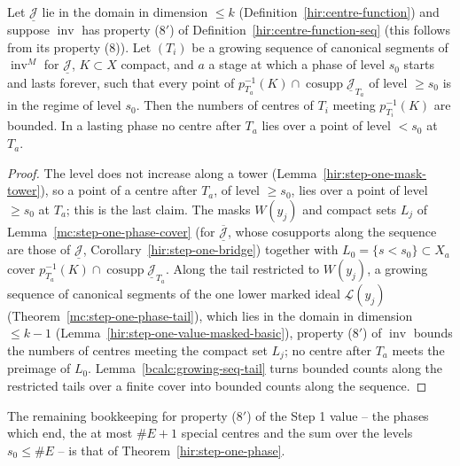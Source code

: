 \begin{theorem}
\label{mc:step-one-phase-bound}
\leanok
Let \(\underline{\mathcal J}\) lie in the domain in dimension \(\le k\) (Definition~\ref{hir:centre-function}) and suppose \(\operatorname{inv}\) has property (8\('\)) of
Definition~\ref{hir:centre-function-seq} (this follows from its property (8)). Let \((T_i)\) be a growing sequence of canonical segments of \(\operatorname{inv}^M\) for
\(\underline{\mathcal J}\), \(K\subset X\) compact, and \(a\) a stage at which a phase of level \(s_0\) starts and lasts forever, such that every point of
\(p_{T_a}^{-1}(K)\cap\operatorname{cosupp}\underline{\mathcal J}_{T_a}\) of level \(\ge s_0\) is in the regime of level \(s_0\). Then the numbers of centres of \(T_i\) meeting
\(p_{T_i}^{-1}(K)\) are bounded. In a lasting phase no centre after \(T_a\) lies over a point of level \(<s_0\) at \(T_a\).
\end{theorem}
\begin{proof}
\leanok
The level does not increase along a tower (Lemma~\ref{hir:step-one-mask-tower}), so a point of a centre after \(T_a\), of level \(\ge s_0\), lies over a point of level \(\ge s_0\)
at \(T_a\); this is the last claim. The masks \(W(y_j)\) and compact sets \(L_j\) of Lemma~\ref{mc:step-one-phase-cover} (for \(\overline{\underline{\mathcal J}}\), whose cosupports along the
sequence are those of \(\underline{\mathcal J}\), Corollary~\ref{hir:step-one-bridge}) together with \(L_0=\{s<s_0\}\subset X_a\) cover
\(p_{T_a}^{-1}(K)\cap\operatorname{cosupp}\underline{\mathcal J}_{T_a}\). Along the tail restricted to \(W(y_j)\), a growing sequence of canonical segments of the one lower marked ideal
\(\underline{\mathcal L}(y_j)\) (Theorem~\ref{mc:step-one-phase-tail}), which lies in the domain in dimension \(\le k-1\) (Lemma~\ref{hir:step-one-value-masked-basic}), property
(8\('\)) of \(\operatorname{inv}\) bounds the numbers of centres meeting the compact set \(L_j\); no centre after \(T_a\) meets the preimage of \(L_0\). Lemma~\ref{bcalc:growing-seq-tail}
turns bounded counts along the restricted tails over a finite cover into bounded counts along the sequence.
\end{proof}
The remaining bookkeeping for property (8\('\)) of the Step 1 value -- the phases which end, the at most \(\#E+1\) special centres and the sum over the levels
\(s_0\le\#E\) -- is that of Theorem~\ref{hir:step-one-phase}.

